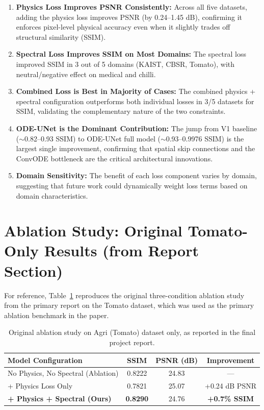 \begin{enumerate}
    \item \textbf{Physics Loss Improves PSNR Consistently:} Across all five datasets, adding the physics loss improves PSNR (by 0.24--1.45 dB), confirming it enforces pixel-level physical accuracy even when it slightly trades off structural similarity (SSIM).
    \item \textbf{Spectral Loss Improves SSIM on Most Domains:} The spectral loss improved SSIM in 3 out of 5 domains (KAIST, CBSR, Tomato), with neutral/negative effect on medical and chilli.
    \item \textbf{Combined Loss is Best in Majority of Cases:} The combined physics + spectral configuration outperforms both individual losses in 3/5 datasets for SSIM, validating the complementary nature of the two constraints.
    \item \textbf{ODE-UNet is the Dominant Contribution:} The jump from V1 baseline ($\sim$0.82--0.93 SSIM) to ODE-UNet full model ($\sim$0.93--0.9976 SSIM) is the largest single improvement, confirming that spatial skip connections and the ConvODE bottleneck are the critical architectural innovations.
    \item \textbf{Domain Sensitivity:} The benefit of each loss component varies by domain, suggesting that future work could dynamically weight loss terms based on domain characteristics.
\end{enumerate}

\section{Ablation Study: Original Tomato-Only Results (from Report Section)}

For reference, Table~\ref{tab:ablation_tomato} reproduces the original three-condition ablation study from the primary report on the Tomato dataset, which was used as the primary ablation benchmark in the paper.

\begin{table}[htbp]
\centering
\caption{Original ablation study on Agri (Tomato) dataset only, as reported in the final project report.}
\label{tab:ablation_tomato}
\begin{tabular}{lccc}
\toprule
\textbf{Model Configuration} & \textbf{SSIM} & \textbf{PSNR (dB)} & \textbf{Improvement} \\
\midrule
No Physics, No Spectral (Ablation) & 0.8222 & 24.83 & --- \\
+ Physics Loss Only                & 0.7821 & 25.07 & +0.24 dB PSNR \\
\textbf{+ Physics + Spectral (Ours)} & \textbf{0.8290} & 24.76 & \textbf{+0.7\% SSIM} \\
\bottomrule
\end{tabular}
\end{table}